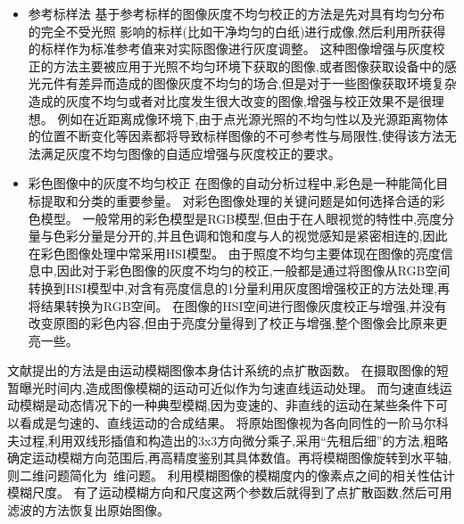\documentclass{amsart}
\begin{document}
\begin{itemize}
\item 参考标样法
基于参考标样的图像灰度不均匀校正的方法是先对具有均匀分布的完全不受光照
影响的标样(比如干净均匀的白纸)进行成像,然后利用所获得的标样作为标准参考值来对实际图像进行灰度调整。
这种图像增强与灰度校正的方法主要被应用于光照不均匀环境下获取的图像,或者图像获取设备中的感光元件有差异而造成的图像灰度不均匀的场合,但是对于一些图像获取环境复杂造成的灰度不均匀或者对比度发生很大改变的图像,增强与校正效果不是很理想。
例如在近距离成像环境下,由于点光源光照的不均匀性以及光源距离物体的位置不断变化等因素都将导致标样图像的不可参考性与局限性,使得该方法无法满足灰度不均匀图像的自适应增强与灰度校正的要求。
\item 彩色图像中的灰度不均匀校正
  在图像的自动分析过程中,彩色是一种能简化目标提取和分类的重要参量。
  对彩色图像处理的关键问题是如何选择合适的彩色模型。
  一般常用的彩色模型是RGB模型,但由于在人眼视觉的特性中,亮度分量与色彩分量是分开的,并且色调和饱和度与人的视觉感知是紧密相连的,因此在彩色图像处理中常采用HSI模型。
  由于照度不均匀主要体现在图像的亮度信息中,因此对于彩色图像的灰度不均匀的校正,一般都是通过将图像从RGB空间转换到HSI模型中,对含有亮度信息的1分量利用灰度图增强校正的方法处理,再将结果转换为RGB空间。
  在图像的HSI空间进行图像灰度校正与增强,并没有改变原图的彩色内容,但由于亮度分量得到了校正与增强,整个图像会比原来更亮一些。
\end{itemize}


文献\cite{马明}提出的方法是由运动模糊图像本身估计系统的点扩散函数。
在摄取图像的短暂曝光时间内,造成图像模糊的运动可近似作为匀速直线运动处理。
而匀速直线运动模糊是动态情况下的一种典型模糊,因为变速的、非直线的运动在某些条件下可以看成是匀速的、直线运动的合成结果。
将原始图像视为各向同性的一阶马尔科夫过程,利用双线形插值和构造出的3x3方向微分乘子,采用“先租后细”的方法,粗略确定运动模糊方向范围后,再高精度鉴别其具体数值。再将模糊图像旋转到水平轴,则二维问题简化为~维问题。
利用模糊图像的模糊度内的像素点之间的相关性估计模糊尺度。
有了运动模糊方向和尺度这两个参数后就得到了点扩散函数,然后可用滤波的方法恢复出原始图像。




\end{document}
